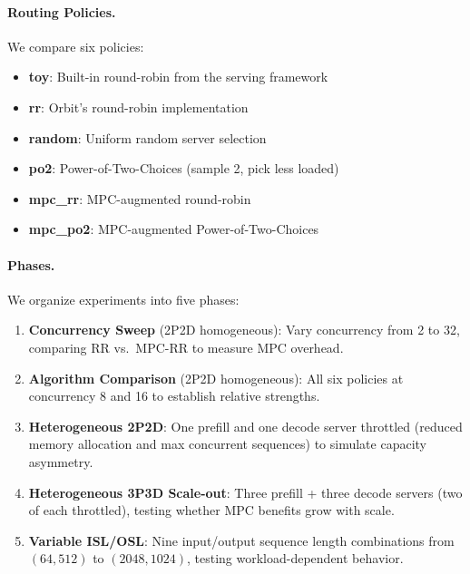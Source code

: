 \documentclass[runningheads]{llncs}
\begin{document}
\paragraph{Routing Policies.} We compare six policies:
\begin{itemize}
    \item \textbf{toy}: Built-in round-robin from the serving framework
    \item \textbf{rr}: Orbit's round-robin implementation
    \item \textbf{random}: Uniform random server selection
    \item \textbf{po2}: Power-of-Two-Choices (sample 2, pick less loaded)
    \item \textbf{mpc\_rr}: MPC-augmented round-robin
    \item \textbf{mpc\_po2}: MPC-augmented Power-of-Two-Choices
\end{itemize}

\paragraph{Phases.} We organize experiments into five phases:

\begin{enumerate}
    \item[\textbf{P1}] \textbf{Concurrency Sweep} (2P2D homogeneous): Vary concurrency from 2 to 32, comparing RR vs.\ MPC-RR to measure MPC overhead.
    
    \item[\textbf{P2}] \textbf{Algorithm Comparison} (2P2D homogeneous): All six policies at concurrency 8 and 16 to establish relative strengths.
    
    \item[\textbf{P3}] \textbf{Heterogeneous 2P2D}: One prefill and one decode server throttled (reduced memory allocation and max concurrent sequences) to simulate capacity asymmetry.
    
    \item[\textbf{P4}] \textbf{Heterogeneous 3P3D Scale-out}: Three prefill + three decode servers (two of each throttled), testing whether MPC benefits grow with scale.
    
    \item[\textbf{P5}] \textbf{Variable ISL/OSL}: Nine input/output sequence length combinations from $(64, 512)$ to $(2048, 1024)$, testing workload-dependent behavior.
\end{enumerate}
\end{document}
